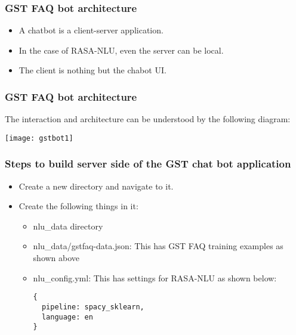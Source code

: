  \begin{frame}[fragile]\frametitle{GST FAQ bot architecture}
\begin{itemize}
\item A chatbot is a client-server application. 
\item In the case of RASA-NLU, even the server can be local. 
\item The client is nothing but the chabot UI.
\end{itemize}
\end{frame}

 \begin{frame}[fragile]\frametitle{GST FAQ bot architecture}
The interaction and architecture can be understood by the following diagram:

\begin{center}
\texttt{[image: gstbot1]}
\end{center}

\end{frame}

 \begin{frame}[fragile]\frametitle{Steps to build server side of the GST chat bot application}
 \begin{itemize}
\item Create a new directory and navigate to it.
\item Create the following things in it:
\begin{itemize}
\item nlu\_data directory
\item nlu\_data/gstfaq-data.json: This has GST FAQ training examples as shown above
\item nlu\_config.yml: This has settings for RASA-NLU as shown below:
\begin{lstlisting}
{
  pipeline: spacy_sklearn,
  language: en
}
\end{lstlisting}
\end{itemize}
\end{itemize}
\end{frame}

